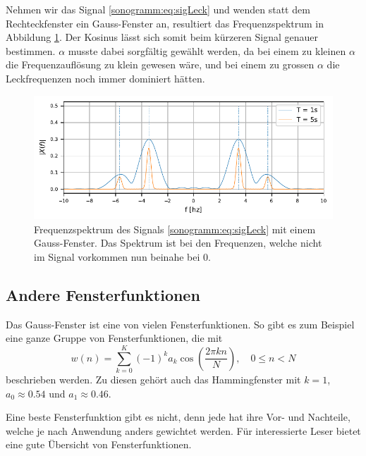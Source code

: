 Nehmen wir das Signal \eqref{sonogramm:eq:sigLeck} und wenden statt dem Rechteckfenster
ein Gauss-Fenster an, resultiert das Frequenzspektrum in Abbildung \ref{sonogramm:twoHarmGauss}.
Der Kosinus lässt sich somit beim kürzeren Signal genauer bestimmen.
$\alpha$ musste dabei sorgfältig gewählt werden, da bei einem zu kleinen $\alpha$ die 
Frequenzauflösung zu klein gewesen wäre, und bei einem zu grossen $\alpha$ die Leckfrequenzen
noch immer dominiert hätten.

\begin{figure}
    \centering
    \includegraphics{papers/sonogramm/images/twoHarmGauss.pdf}
    \caption{Frequenzspektrum des Signals \eqref{sonogramm:eq:sigLeck} mit
    einem Gauss-Fenster. Das Spektrum ist bei den Frequenzen, welche nicht im Signal vorkommen
    nun beinahe bei 0.
    \label{sonogramm:twoHarmGauss}
    }
\end{figure}

\subsection{Andere Fensterfunktionen}
Das Gauss-Fenster ist eine von vielen Fensterfunktionen. 
So gibt es zum Beispiel eine ganze Gruppe von Fensterfunktionen, die mit
\begin{equation}
    w(n) = \sum_{k=0}^{K} (-1)^k a_k \cos\left(\frac{2 \pi k n}{N}\right), \quad 0 \leq n < N
\end{equation}
beschrieben werden.
Zu diesen gehört auch das Hammingfenster mit $k = 1$, $a_0 \approx 0.54$ und $a_1 \approx 0.46$.

Eine beste Fensterfunktion gibt es nicht, denn jede hat ihre Vor- und Nachteile, welche
je nach Anwendung anders gewichtet werden.
Für interessierte Leser bietet \cite{sonogramm:wikiWin} eine 
gute Übersicht von Fensterfunktionen.

